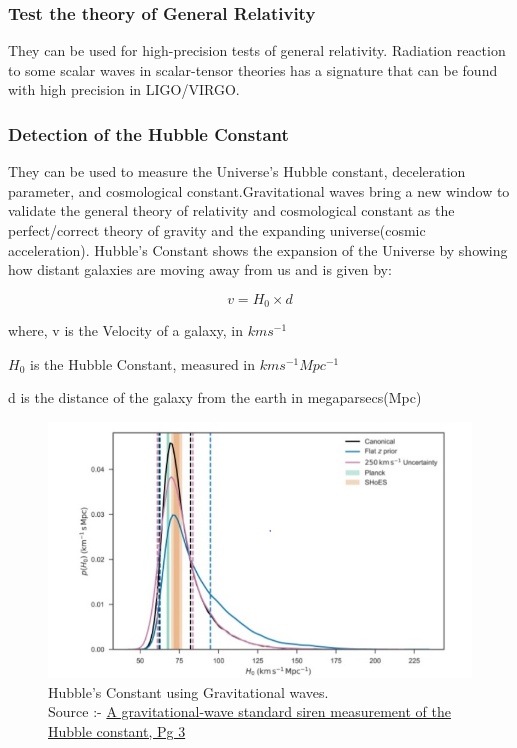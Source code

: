 \subsubsection*{Test the theory of General Relativity}
\hspace{1cm}They can be used for high-precision tests of general relativity. Radiation reaction to some scalar waves in scalar-tensor theories has a signature that can be found with high precision in LIGO/VIRGO.

\subsubsection*{Detection of the Hubble Constant}
\hspace{1cm}They can be used to measure the Universe’s Hubble constant, deceleration parameter, and cosmological constant.Gravitational waves bring a new window to validate the general theory of relativity and cosmological constant as the perfect/correct theory of gravity and the expanding universe(cosmic acceleration). Hubble's Constant shows the expansion of the Universe by showing how distant galaxies are moving away from us and is given by:
 
\begin{equation}
v = H_0 \times d
\end{equation}

where, v is the Velocity of a galaxy, in $kms^{-1}$

      $H_{0}$ is the Hubble Constant, measured in $kms^{-1}Mpc^{-1}$
      
      d is the distance of the galaxy from the earth in megaparsecs(Mpc)

\vspace{1cm}

\begin{figure}[h]
    \centering
    \includegraphics[scale=0.9]{images.tex/HCGW.jpg}
    \caption{Hubble's Constant using Gravitational waves.\\
    Source :- \href{https://www.researchgate.net/profile/Michael-Ross-9/publication/324600496}{A gravitational-wave standard siren measurement of the Hubble constant, Pg 3}}
\end{figure}


